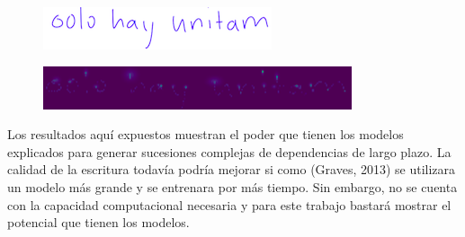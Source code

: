 \begin{figure}[htbp]
\begin{center}
\includegraphics{./imag/solo4.png}
\end{center}
\caption{}
\end{figure}
\begin{figure}[htbp]
\begin{center}
\includegraphics{./imag/solo5.png}
\end{center}
\caption{}
\end{figure}

\vspace{3em}

Los resultados aquí expuestos muestran el poder que tienen los modelos explicados para generar sucesiones complejas de dependencias de largo plazo. La calidad de la escritura todavía podría mejorar si como (Graves, 2013) se utilizara un modelo más grande y se entrenara por más tiempo. Sin embargo, no se cuenta con la capacidad computacional necesaria y para este trabajo bastará mostrar el potencial que tienen los modelos.
\cite{DBLP:journals/corr/Graves13}